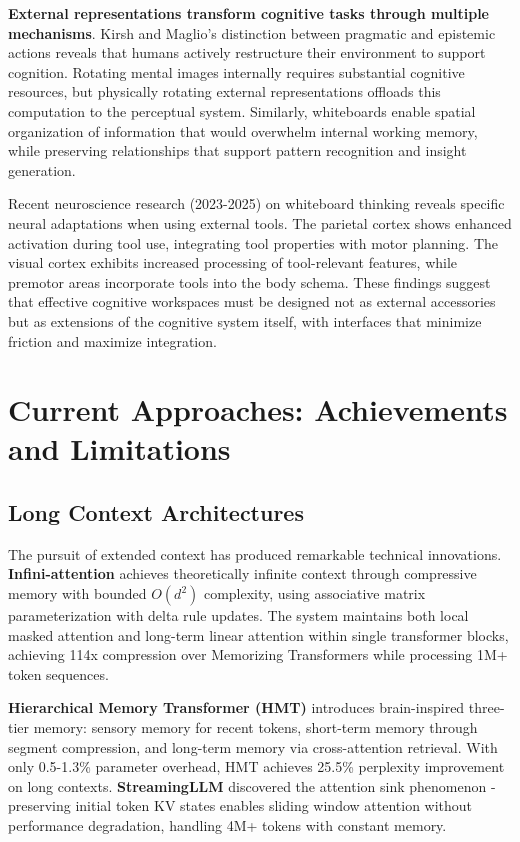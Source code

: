 \documentclass[10pt,twocolumn]{article}
\begin{document}
\textbf{External representations transform cognitive tasks through multiple mechanisms}. Kirsh and Maglio's distinction between pragmatic and epistemic actions reveals that humans actively restructure their environment to support cognition. Rotating mental images internally requires substantial cognitive resources, but physically rotating external representations offloads this computation to the perceptual system. Similarly, whiteboards enable spatial organization of information that would overwhelm internal working memory, while preserving relationships that support pattern recognition and insight generation.

Recent neuroscience research (2023-2025) on whiteboard thinking reveals specific neural adaptations when using external tools. The parietal cortex shows enhanced activation during tool use, integrating tool properties with motor planning. The visual cortex exhibits increased processing of tool-relevant features, while premotor areas incorporate tools into the body schema. These findings suggest that effective cognitive workspaces must be designed not as external accessories but as extensions of the cognitive system itself, with interfaces that minimize friction and maximize integration.

\section{Current Approaches: Achievements and Limitations}

\subsection{Long Context Architectures}

The pursuit of extended context has produced remarkable technical innovations. \textbf{Infini-attention} \cite{munkhdalai2024leave} achieves theoretically infinite context through compressive memory with bounded $O(d^2)$ complexity, using associative matrix parameterization with delta rule updates. The system maintains both local masked attention and long-term linear attention within single transformer blocks, achieving 114x compression over Memorizing Transformers \cite{wu2022memorizing} while processing 1M+ token sequences.

\textbf{Hierarchical Memory Transformer (HMT)} \cite{yu2024hmt} introduces brain-inspired three-tier memory: sensory memory for recent tokens, short-term memory through segment compression, and long-term memory via cross-attention retrieval. With only 0.5-1.3\% parameter overhead, HMT achieves 25.5\% perplexity improvement on long contexts. \textbf{StreamingLLM} \cite{xiao2024efficient} discovered the attention sink phenomenon - preserving initial token KV states enables sliding window attention without performance degradation, handling 4M+ tokens with constant memory.
\end{document}
